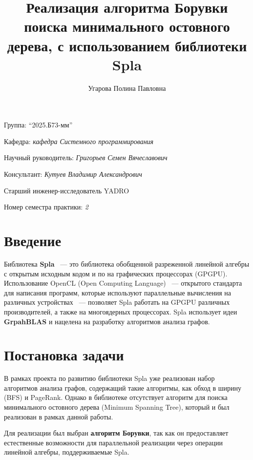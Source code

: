 \documentclass[a4paper]{article}
\title{Реализация алгоритма Борувки поиска минимального остовного дерева, с использованием библиотеки Spla}
\author{Угарова Полина Павловна}
\date{}
\begin{document}
\maketitle

\begin{flushright}
    Группа: \enquote{2025.Б73-мм}

    Кафедра: \emph{кафедра Системного программирования}

    Научный руководитель: \emph{Григорьев Семен Вячеславович}

    Консультант: \emph{Кутуев Владимир Александрович}
    
    Старший инженер-исследователь YADRO
    
    Номер семестра практики: \emph{2}
\end{flushright} 

\section{Введение}
Библиотека \textbf{Spla} \cite{spla_orig, orachev} ~--- это библиотека обобщенной разреженной линейной алгебры с открытым исходным кодом и по на графических процессорах (GPGPU). Использование OpenCL (Open Computing Language) ~--- открытого стандарта для написания программ, которые используют параллельные вычисления на различных устройствах ~--- позволяет Spla работать на GPGPU различных производителей, а также на многоядерных процессорах. Spla использует идеи \textbf{GrpahBLAS} \cite{graphblas} и нацелена на разработку алгоритмов анализа графов.
\section{Постановка задачи}

В рамках проекта по развитию библиотеки Spla уже реализован набор алгоритмов анализа графов, содержащий такие алгоритмы, как обход в ширину (BFS) и PageRank. Однако в библиотеке отсутствует алгоритм для поиска минимального остовного дерева (Minimum Spanning Tree), который и был реализован в рамках данной работы.

Для реализации был выбран \textbf{алгоритм Борувки}, так как он предоставляет естественные возможности для параллельной реализации через операции линейной алгебры, поддерживаемые Spla.
\end{document}
